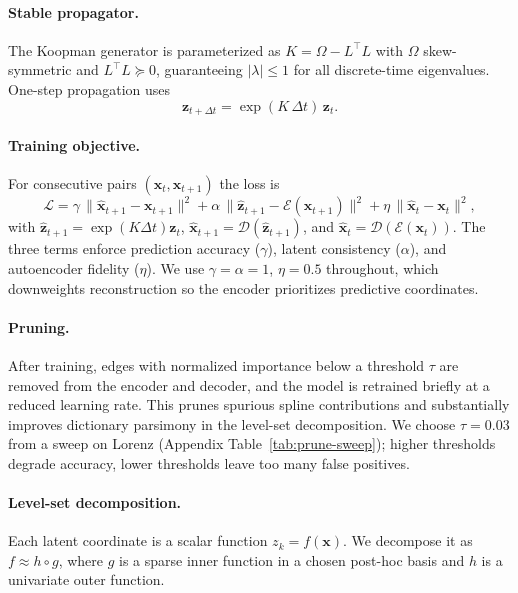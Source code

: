 \documentclass{article}
\newcommand{\x}{\bm{x}}
\newcommand{\z}{\bm{z}}
\begin{document}
\paragraph{Stable propagator.}
The Koopman generator is parameterized as $K = \Omega - L^\top L$ with $\Omega$
skew-symmetric and $L^\top L\succeq 0$, guaranteeing $|\lambda|\le 1$ for all
discrete-time eigenvalues. One-step propagation uses
\begin{equation}
  \z_{t+\Delta t} = \exp(K\,\Delta t)\,\z_t.
  \label{eq:koopman-prop}
\end{equation}

\paragraph{Training objective.}
For consecutive pairs $(\x_t,\x_{t+1})$ the loss is
\begin{equation}
  \mathcal{L} = \gamma\,\|\hat{\x}_{t+1}-\x_{t+1}\|^2
              + \alpha\,\|\hat{\z}_{t+1}-\mathcal{E}(\x_{t+1})\|^2
              + \eta\,\|\hat{\x}_t-\x_t\|^2,
  \label{eq:loss}
\end{equation}
with $\hat{\z}_{t+1} = \exp(K\Delta t)\z_t$,
$\hat{\x}_{t+1}=\mathcal{D}(\hat{\z}_{t+1})$, and
$\hat{\x}_t = \mathcal{D}(\mathcal{E}(\x_t))$. The three terms enforce
prediction accuracy ($\gamma$), latent consistency ($\alpha$), and autoencoder
fidelity ($\eta$). We use $\gamma=\alpha=1$, $\eta=0.5$ throughout, which
downweights reconstruction so the encoder prioritizes predictive coordinates.


\paragraph{Pruning.}
After training, edges with normalized importance below a threshold $\tau$ are
removed from the encoder and decoder, and the model is retrained briefly at a
reduced learning rate. This prunes spurious spline contributions and
substantially improves dictionary parsimony in the level-set decomposition.
We choose $\tau=0.03$ from a sweep on Lorenz (Appendix
Table~\ref{tab:prune-sweep}); higher thresholds degrade accuracy, lower
thresholds leave too many false positives.

\paragraph{Level-set decomposition.}
\label{sec:levelset}
Each latent coordinate is a scalar function $z_k = f(\x)$. We decompose it as
$f \approx h\!\circ\!g$, where $g$ is a sparse inner function in a chosen
post-hoc basis and $h$ is a univariate outer function.
\end{document}
